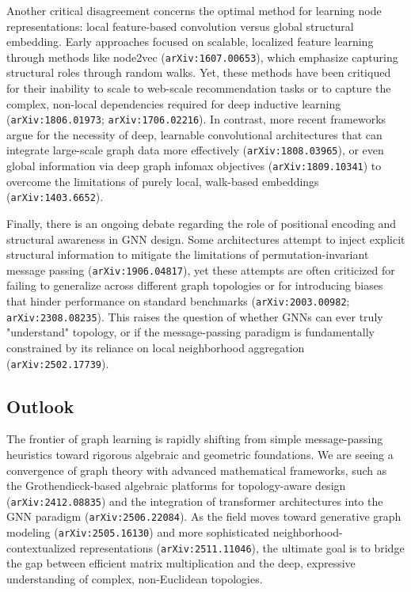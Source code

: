 \documentclass[11pt]{article}
\begin{document}
Another critical disagreement concerns the optimal method for learning node representations: local feature-based convolution versus global structural embedding. Early approaches focused on scalable, localized feature learning through methods like node2vec (\texttt{arXiv:1607.00653}), which emphasize capturing structural roles through random walks. Yet, these methods have been critiqued for their inability to scale to web-scale recommendation tasks or to capture the complex, non-local dependencies required for deep inductive learning (\texttt{arXiv:1806.01973}; \texttt{arXiv:1706.02216}). In contrast, more recent frameworks argue for the necessity of deep, learnable convolutional architectures that can integrate large-scale graph data more effectively (\texttt{arXiv:1808.03965}), or even global information via deep graph infomax objectives (\texttt{arXiv:1809.10341}) to overcome the limitations of purely local, walk-based embeddings (\texttt{arXiv:1403.6652}).

Finally, there is an ongoing debate regarding the role of positional encoding and structural awareness in GNN design. Some architectures attempt to inject explicit structural information to mitigate the limitations of permutation-invariant message passing (\texttt{arXiv:1906.04817}), yet these attempts are often criticized for failing to generalize across different graph topologies or for introducing biases that hinder performance on standard benchmarks (\texttt{arXiv:2003.00982}; \texttt{arXiv:2308.08235}). This raises the question of whether GNNs can ever truly "understand" topology, or if the message-passing paradigm is fundamentally constrained by its reliance on local neighborhood aggregation (\texttt{arXiv:2502.17739}).

\subsection{Outlook}

The frontier of graph learning is rapidly shifting from simple message-passing heuristics toward rigorous algebraic and geometric foundations. We are seeing a convergence of graph theory with advanced mathematical frameworks, such as the Grothendieck-based algebraic platforms for topology-aware design (\texttt{arXiv:2412.08835}) and the integration of transformer architectures into the GNN paradigm (\texttt{arXiv:2506.22084}). As the field moves toward generative graph modeling (\texttt{arXiv:2505.16130}) and more sophisticated neighborhood-contextualized representations (\texttt{arXiv:2511.11046}), the ultimate goal is to bridge the gap between efficient matrix multiplication and the deep, expressive understanding of complex, non-Euclidean topologies.
\end{document}
